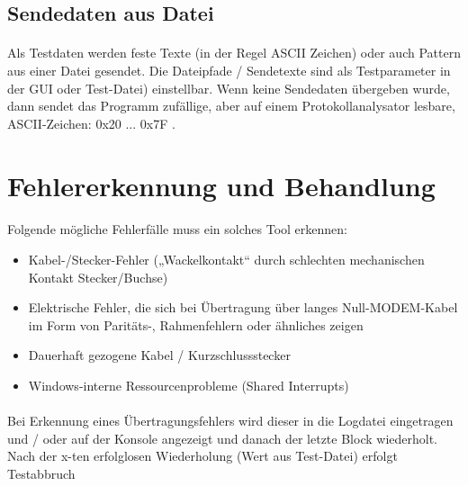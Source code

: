 \subsection{Sendedaten aus Datei}
\paragraph{}
Als Testdaten werden feste Texte (in der Regel ASCII Zeichen) oder auch Pattern aus einer Datei gesendet. Die Dateipfade / Sendetexte sind als Testparameter in der GUI oder Test-Datei) einstellbar. Wenn keine Sendedaten übergeben wurde, dann sendet das Programm zufällige, aber auf einem Protokollanalysator lesbare, ASCII-Zeichen: 0x20 ... 0x7F .


\section{Fehlererkennung und Behandlung}
\paragraph{}
Folgende mögliche Fehlerfälle muss ein solches Tool erkennen:
\begin{itemize}
\item Kabel-/Stecker-Fehler („Wackelkontakt“ durch schlechten mechanischen Kontakt Stecker/Buchse) 
\item Elektrische Fehler, die sich bei Übertragung über langes Null-MODEM-Kabel im Form von Paritäts-, Rahmenfehlern oder ähnliches zeigen
\item Dauerhaft gezogene Kabel / Kurzschlussstecker
\item Windows-interne Ressourcenprobleme (Shared Interrupts)
\end{itemize} 
\paragraph{}
Bei Erkennung eines Übertragungsfehlers wird dieser in die Logdatei eingetragen und / oder auf der Konsole angezeigt und danach der letzte Block wiederholt. Nach der x-ten erfolglosen Wiederholung (Wert aus Test-Datei) erfolgt Testabbruch
